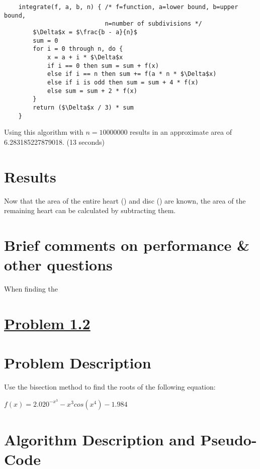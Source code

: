 \documentclass[12pt,letterpaper]{article}
\begin{document}
\begin{spacing}{1}
\begin{spacing}{1.2}
\begin{lstlisting}
    integrate(f, a, b, n) { /* f=function, a=lower bound, b=upper bound, 
                            n=number of subdivisions */
        $\Delta$x = $\frac{b - a}{n}$
        sum = 0
        for i = 0 through n, do {
            x = a + i * $\Delta$x
            if i == 0 then sum = sum + f(x)
            else if i == n then sum += f(a * n * $\Delta$x)
            else if i is odd then sum = sum + 4 * f(x)
            else sum = sum + 2 * f(x)
        }
        return ($\Delta$x / 3) * sum
    }
\end{lstlisting}
Using this algorithm with $n = 10000000$ results in an approximate area of 6.283185227879018. (13 seconds)
\end{spacing}

\section{Results}
Now that the area of the entire heart () and disc () are known, the area of the remaining heart can be calculated by subtracting them.
\section{Brief comments on performance \& other questions}
When finding the 

\newpage

\section*{\underline{Problem 1.2}}
\vspace{2em}

\setcounter{section}{0} %

\section{Problem Description}

Use the bisection method to find the roots of the following equation:

\begin{mdframed}[backgroundcolor=gray!5] 
$f(x) = 2.020^{-x^3} - x^3 cos(x^4) - 1.984$ 
\end{mdframed}

\section{Algorithm Description and Pseudo-Code}


\end{spacing}
\end{document}
